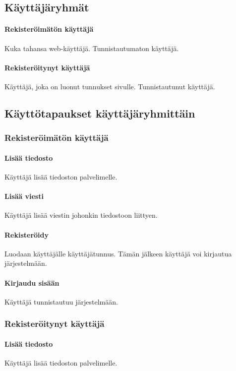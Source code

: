 \documentclass[10pt,a4paper]{article}
\begin{document}
\subsection{Käyttäjäryhmät}
\paragraph{Rekisteröimätön käyttäjä}
Kuka tahansa web-käyttäjä. Tunnistautumaton käyttäjä.

\paragraph{Rekisteröitynyt käyttäjä}
Käyttäjä, joka on luonut tunnukset sivulle. Tunnistautunut käyttäjä.

\subsection{Käyttötapaukset käyttäjäryhmittäin}
\subsubsection{Rekisteröimätön käyttäjä}
\paragraph{Lisää tiedosto}
Käyttäjä lisää tiedoston palvelimelle.
\paragraph{Lisää viesti}
Käyttäjä lisää viestin johonkin tiedostoon liittyen.

\paragraph{Rekisteröidy}
Luodaan käyttäjälle käyttäjätunnus. Tämän jälkeen käyttäjä voi kirjautua järjestelmään.
\paragraph{Kirjaudu sisään}
Käyttäjä tunnistautuu järjestelmään.


\subsubsection{Rekisteröitynyt käyttäjä}
\paragraph{Lisää tiedosto}
Käyttäjä lisää tiedoston palvelimelle.
\end{document}
